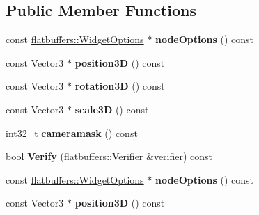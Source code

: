 \subsection*{Public Member Functions}
\begin{DoxyCompactItemize}
\item 
\mbox{\label{structflatbuffers_1_1Node3DOption_a6fd0967c5810abf49150552477da19c9}} 
const \hyperlink{structflatbuffers_1_1WidgetOptions}{flatbuffers\+::\+Widget\+Options} $\ast$ {\bfseries node\+Options} () const
\item 
\mbox{\label{structflatbuffers_1_1Node3DOption_a960cbda8687aea83bcad867fc8596450}} 
const Vector3 $\ast$ {\bfseries position3D} () const
\item 
\mbox{\label{structflatbuffers_1_1Node3DOption_a412ed429f9d609c7e9863565e7e72a17}} 
const Vector3 $\ast$ {\bfseries rotation3D} () const
\item 
\mbox{\label{structflatbuffers_1_1Node3DOption_aa0873a4858c9bc79365fd09ae85220de}} 
const Vector3 $\ast$ {\bfseries scale3D} () const
\item 
\mbox{\label{structflatbuffers_1_1Node3DOption_a88500ccdea1e1bfb69e41996e08c1a6a}} 
int32\+\_\+t {\bfseries cameramask} () const
\item 
\mbox{\label{structflatbuffers_1_1Node3DOption_a32bede007a73eeb5766aff94c183144b}} 
bool {\bfseries Verify} (\hyperlink{classflatbuffers_1_1Verifier}{flatbuffers\+::\+Verifier} \&verifier) const
\item 
\mbox{\label{structflatbuffers_1_1Node3DOption_a6fd0967c5810abf49150552477da19c9}} 
const \hyperlink{structflatbuffers_1_1WidgetOptions}{flatbuffers\+::\+Widget\+Options} $\ast$ {\bfseries node\+Options} () const
\item 
\mbox{\label{structflatbuffers_1_1Node3DOption_a960cbda8687aea83bcad867fc8596450}} 
const Vector3 $\ast$ {\bfseries position3D} () const
\item 

\end{DoxyCompactItemize}
